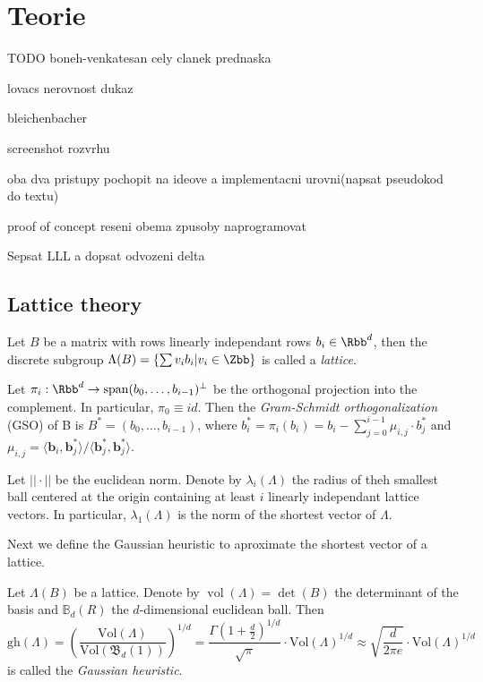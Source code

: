 \chapter{Teorie}

TODO boneh-venkatesan cely clanek prednaska

lovacs nerovnost dukaz

bleichenbacher 

screenshot rozvrhu

oba dva pristupy pochopit na ideove a implementacni urovni(napsat pseudokod do textu)

proof of concept reseni obema zpusoby naprogramovat


Sepsat LLL a dopsat odvozeni delta 

\section{Lattice theory}
Let $B$ be a matrix with rows linearly independant rows $b_i \in \Rbb^d$, then the discrete subgroup $\Lambda(B) = \{\sum v_i b_i | v_i \in \Zbb\}$ is called a \textit{lattice}. 

Let $\pi_i : \Rbb^d \to \operatorname{span}(b_0, \ldots, b_{i-1})^\perp$ be the orthogonal projection into the complement. In particular, $\pi_0 \equiv id$. Then the \textit{Gram-Schmidt orthogonalization} (GSO) of B is $B^* = (b_0, \ldots, b_{i-1})$, where $b^*_i = \pi_i(b_i) = b_i - \sum_{j=0}^{i-1} \mu_{i,j} \cdot b_j^*$ and $\mu_{i,j} = \langle \boldsymbol{b}_i, \boldsymbol{b}_j^* \rangle / \langle \boldsymbol{b}_j^*, \boldsymbol{b}_j^* \rangle$. 

Let $|| \cdot ||$ be the euclidean norm. Denote by $\lambda_i(\Lambda)$ the radius of theh smallest ball centered at the origin containing at least $i$ linearly independant lattice vectors. In particular, $\lambda_1(\Lambda)$ is the norm of the shortest vector of $\Lambda$.

Next we define the Gaussian heuristic to aproximate the shortest vector of a lattice.

\begin{definition}
    Let $\Lambda(B)$ be a lattice. Denote by $\operatorname*{vol}(\Lambda) = \operatorname*{det}(B)$ the determinant of the basis and $\mathbb{B}_d(R)$ the $d$-dimensional euclidean ball. Then 
    \begin{equation*}
        \mathrm{gh}(\Lambda) = \left(\frac{\mathrm{Vol}(\Lambda)}{\mathrm{Vol}(\mathfrak{B}_d(1))}\right)^{1/d} = \frac{\Gamma\left(1+\frac{d}{2}\right)^{1/d}}{\sqrt{\pi}} \cdot \mathrm{Vol}(\Lambda)^{1/d} \approx \sqrt{\frac{d}{2\pi e}} \cdot \mathrm{Vol}(\Lambda)^{1/d}
    \end{equation*}
    is called the \textit{Gaussian heuristic}.
\end{definition}

